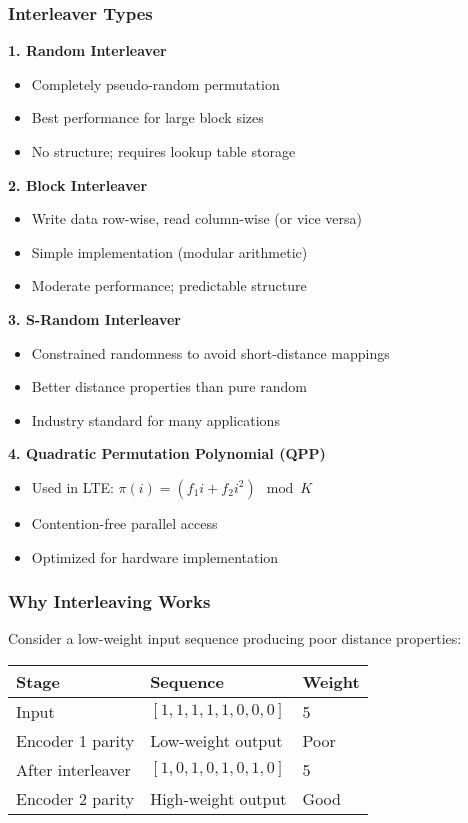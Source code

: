 \subsubsection{Interleaver Types}

\textbf{1. Random Interleaver}
\begin{itemize}
\item Completely pseudo-random permutation
\item Best performance for large block sizes
\item No structure; requires lookup table storage
\end{itemize}

\textbf{2. Block Interleaver}
\begin{itemize}
\item Write data row-wise, read column-wise (or vice versa)
\item Simple implementation (modular arithmetic)
\item Moderate performance; predictable structure
\end{itemize}

\textbf{3. S-Random Interleaver}
\begin{itemize}
\item Constrained randomness to avoid short-distance mappings
\item Better distance properties than pure random
\item Industry standard for many applications
\end{itemize}

\textbf{4. Quadratic Permutation Polynomial (QPP)}
\begin{itemize}
\item Used in LTE: $\pi(i) = (f_1 i + f_2 i^2) \mod K$
\item Contention-free parallel access
\item Optimized for hardware implementation
\end{itemize}

\subsubsection{Why Interleaving Works}

Consider a low-weight input sequence producing poor distance properties:

\begin{center}
\begin{tabular}{@{}lll@{}}
\toprule
Stage & Sequence & Weight \\
\midrule
Input & $[1, 1, 1, 1, 1, 0, 0, 0]$ & 5 \\
Encoder 1 parity & Low-weight output & Poor \\
\midrule
After interleaver & $[1, 0, 1, 0, 1, 0, 1, 0]$ & 5 \\
Encoder 2 parity & High-weight output & Good \\
\bottomrule
\end{tabular}
\end{center}

